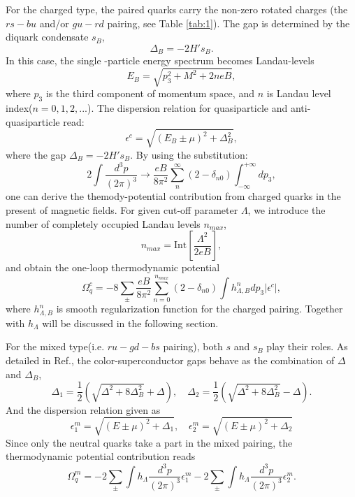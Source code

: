 \documentclass[prd, showpacs,nofootinbib,amsmath,amssymb,12pt]{revtex4}
\begin{document}
For the charged type, the paired quarks carry the non-zero rotated charges (the $rs-bu$ and/or $gu-rd$ pairing, see Table \ref{tab:1}).
The gap is determined by the diquark condensate $s_B$,
\begin{equation}
\Delta_B=-2H's_B.
\end{equation}
In this case, the single -particle energy spectrum becomes Landau-levels
\begin{equation}
\label{eq:energyb}
E_B=\sqrt{p^2_3+M^2 + 2neB},
\end{equation}
where $p_3$ is the third component of momentum space, and $n$ is Landau level index($n=0,1,2,...$).
The dispersion relation for quasiparticle and anti-quasiparticle read:
\begin{equation}
    \epsilon^c=\sqrt{(E_B\pm\mu)^2+\Delta_B^2},
\end{equation}
where the gap $\Delta_B=-2H' s_B$.
By using the substitution:
\begin{equation}
2\int\frac{d^3p}{(2\pi)^3}\rightarrow\frac{eB}{8\pi^2}\sum^{\infty}_n(2-\delta_{n0})\int^{+\infty}_{-\infty} dp_3,
\label{eq:momentumsub}
\end{equation}
one can derive the themody-potential contribution from charged quarks in the present of magnetic fields.
For given cut-off parameter $\Lambda$, we introduce the number of completely occupied Landau levels $n_{max}$,
\begin{equation}\label{eq:nmax}
  n_{max}= \text{Int}[\frac{\Lambda^2}{2eB}],
\end{equation}
and obtain the one-loop thermodynamic potential 
\begin{equation}
\Omega^c_q=-8\sum_{\pm}\frac{eB}{8\pi^2}\sum_{n=0}^{n_{max}} (2 -\delta_{n0}) \int h^n_{\Lambda,B} dp_3|\epsilon^c|, 
\end{equation}
where $h^n_{\Lambda,B}$ is smooth regularization function for the charged pairing. Together with $h_\Lambda$ will be discussed in the following section.

For the mixed type(i.e. $ru-gd-bs$ pairing),  both $s$ and $s_B$ play their roles.
As detailed in Ref.\cite{Ferrer2006Color,noronha2007color},
the color-superconductor gaps behave as the combination of $\Delta$ and $\Delta_B$,
\begin{equation}
\Delta_{1}=\frac{1}{2}(\sqrt{\Delta^2 + 8\Delta_B^2} + \Delta),\quad
\Delta_{2}=\frac{1}{2}(\sqrt{\Delta^2 + 8\Delta_B^2} - \Delta).
\end{equation}
And the dispersion relation given as
\begin{equation}
\epsilon^m_1=\sqrt{(E\pm\mu)^2+\Delta_1},\quad \epsilon^m_2=\sqrt{(E\pm\mu)^2+\Delta_2}
\end{equation}
Since only the neutral quarks take a part in the mixed pairing,
the thermodynamic potential contribution reads \cite{noronha2007color}
\begin{equation}
\Omega^m_q=-2\sum_{\pm}\int h_{\Lambda}\frac{d^3p}{(2\pi)^3}  \epsilon^m_1 -2\sum_{\pm}\int h_{\Lambda}\frac{d^3p}{(2\pi)^3}  \epsilon^m_2.
\end{equation}
\end{document}
